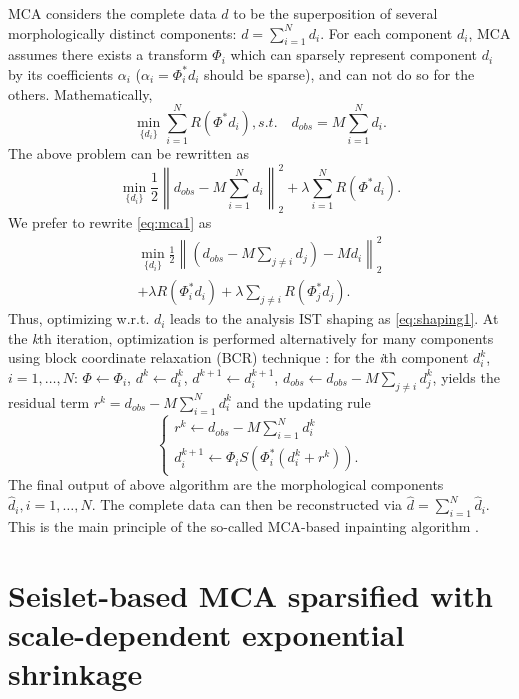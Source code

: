 MCA considers the complete data $d$ to be the superposition of several morphologically distinct components: $d=\sum_{i=1}^Nd_i$. For each component $d_i$, MCA assumes there exists a transform $\Phi_i$ which can sparsely represent component $d_i$ by its coefficients $\alpha_i$ ($\alpha_i=\Phi_i^{*}d_i$ should be sparse), and can not do so for the others. Mathematically,
\begin{equation}\label{eq:mca_un}
  \min_{\{d_i\}}\sum_{i=1}^{N}R(\Phi^{*}d_i), s.t.\quad  d_{obs}=M\sum_{i=1}^{N}d_i.
\end{equation}
The above problem can be rewritten as
\begin{equation}\label{eq:mca1}
  \min_{\{d_i\}}\frac{1}{2}\left\|d_{obs}-M\sum_{i=1}^Nd_i\right\|_2^2+\lambda \sum_{i=1}^NR(\Phi^{*}d_i).
\end{equation}
We prefer to rewrite \eqref{eq:mca1} as
\begin{eqnarray}
  \min_{\{d_i\}}\frac{1}{2}\left\|\left(d_{obs}-M\sum_{j\neq i}d_j\right)-Md_i\right\|_2^2 \nonumber\\
   +\lambda R(\Phi_i^{*}d_i)+\lambda \sum_{j\neq i}R(\Phi_j^{*}d_j).
\end{eqnarray}
Thus, optimizing w.r.t. $d_i$ leads to the analysis IST shaping as \eqref{eq:shaping1}. At the \emph{k}th iteration, optimization is performed alternatively for many components using block coordinate relaxation (BCR) technique \citep{bruce1998block}: for the \emph{i}th component $d_i^{k}$, $i=1,\ldots,N$: $\Phi\leftarrow \Phi_i$, $d^{k}\leftarrow d_i^{k}$, $d^{k+1}\leftarrow d_i^{k+1}$, $d_{obs}\leftarrow d_{obs}-M\sum_{j\neq i}d_j^{k}$, yields the residual term $r^{k}=d_{obs}-M\sum_{i=1}^N d_i^{k}$ and the updating rule
\begin{equation}\label{eq:mca2}
  \left\{
  \begin{array}{l}
    r^{k}\leftarrow d_{obs}-M\sum_{i=1}^N d_i^{k}  \\
    d_i^{k+1}\leftarrow \Phi_i S(\Phi_i^{*}(d_i^{k}+r^{k})).
  \end{array}
  \right.
\end{equation}
The final output of above algorithm are the morphological components $\hat{d}_i,i=1,\ldots,N$. The complete data can then be reconstructed via $\hat{d}=\sum_{i=1}^N \hat{d}_i$.
This is the main principle of the so-called MCA-based inpainting algorithm \citep{Elad2005}.


\section{Seislet-based MCA sparsified with scale-dependent exponential shrinkage}

